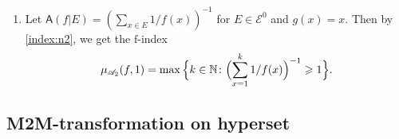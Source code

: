 \documentclass[preprint,11pt]{elsarticle}
\theoremstyle{definition}
\newcommand\mN{{\mathbb N}}
\newcommand\cE{{\mathcal E}}
\newcommand\sA{\mathsf{A}}
\newcommand\aA[2][E]{\sA(#2|#1)}%
\newcommand\bA{\mathscr{A}}%
\newcommand\mub[1][\bA]{\mu_{#1}}
\renewcommand\ge{\geqslant}
\newcommand{\tx}{\textstyle{}}
\begin{document}
\begin{enumerate}[noitemsep]
     \item Let $\aA{f}=\tx{(\sum_{x\in E} 1/f(x))^{-1}}$ for $E\in\cE^0$ and $g(x)=x$. Then by \eqref{index:n2}, we get the $\mathrm{f}$-index \cite[formula~(3)]{tol}
    \begin{align*}
        \mub[\bA_2](f,1)=\max\Big\{k\in\mN\colon \Bigl(\sum_{x=1}^k 1/f(x)\Bigr)^{-1}\ge 1\Big\}.
    \end{align*}

\end{enumerate}

\subsection{\textbf{M2M-transformation on hyperset}}\label{sec:3.4}
\end{document}
